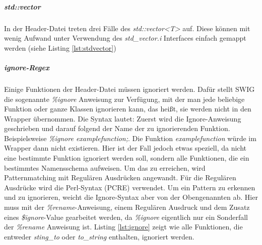 \begin{code}[caption={std::map},label={lst:stdmap}, escapechar=|]

	

\end{code}

\subparagraph{std::vector}

In der Header-Datei treten drei Fälle des \emph{std::vector<T>} auf. Diese können mit wenig Aufwand unter Verwendung des \emph{std\_vector.i} Interfaces einfach gemappt werden (siehe Listing \ref{lst:stdvector})

\begin{code}[caption={std::vector},label={lst:stdvector}, escapechar=|]

\end{code}

\subparagraph{ignore-Regex}
Einige Funktionen der Header-Datei müssen ignoriert werden. Dafür stellt SWIG die sogenannte \emph{\%ignore} Anweisung zur Verfügung, mit der man jede beliebige Funktion oder ganze Klassen ignorieren kann, das heißt, sie werden nicht in den Wrapper übernommen. Die Syntax lautet: Zuerst wird die Ignore-Anweisung geschrieben und darauf folgend der Name der zu ignorierenden Funktion. Beispielsweise \emph{\%ignore examplefunction;}. Die Funktion \emph{examplefunction} würde im Wrapper dann nicht existieren. Hier ist der Fall jedoch etwas speziell, da nicht eine bestimmte Funktion ignoriert werden soll, sondern alle Funktionen, die ein bestimmtes Namensschema aufweisen. Um das zu erreichen, wird Patternmatching mit Regulären Ausdrücken angewandt. Für die Regulären Ausdrücke wird die Perl-Syntax (PCRE) verwendet. Um ein Pattern zu erkennen und zu ignorieren, weicht die Ignore-Syntax aber von der Obengenannten ab. Hier muss mit der \emph{\%rename}-Anweisung, einem Regulären Ausdruck und dem Zusatz eines \emph{\$ignore}-Value gearbeitet werden, da \emph{\%ignore} eigentlich nur ein Sonderfall der \emph{\%rename} Anweisung ist.
Listing \ref{lst:ignore} zeigt wie alle Funktionen, die entweder \emph{sting\_to} oder \emph{to\_string} enthalten, ignoriert werden.

